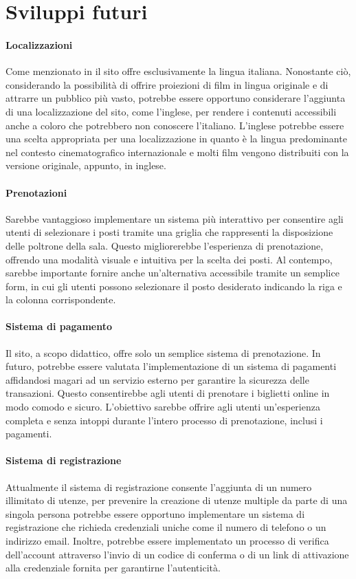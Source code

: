 \section{Sviluppi futuri} \label{sviluppi_futuri}
\paragraph{Localizzazioni} Come menzionato in \textit{} il sito offre esclusivamente la lingua italiana.
Nonostante ciò, considerando la possibilità di offrire proiezioni di film in lingua originale e di attrarre un pubblico più vasto, potrebbe essere opportuno considerare l'aggiunta di una localizzazione del sito, come l'inglese, per rendere i contenuti accessibili anche a coloro che potrebbero non conoscere l'italiano.
L'inglese potrebbe essere una scelta appropriata per una localizzazione in quanto è la lingua predominante nel contesto cinematografico internazionale e molti film vengono distribuiti con la versione originale, appunto, in inglese.

\paragraph{Prenotazioni} Sarebbe vantaggioso implementare un sistema più interattivo per consentire agli utenti di selezionare i posti tramite una griglia che rappresenti la disposizione delle poltrone della sala. Questo migliorerebbe l'esperienza di prenotazione, offrendo una modalità visuale e intuitiva per la scelta dei posti. Al contempo, sarebbe importante fornire anche un'alternativa accessibile tramite un semplice form, in cui gli utenti possono selezionare il posto desiderato indicando la riga e la colonna corrispondente.

\paragraph{Sistema di pagamento} Il sito, a scopo didattico, offre solo un semplice sistema di prenotazione. In futuro, potrebbe essere valutata l'implementazione di un sistema di pagamenti affidandosi magari ad un servizio esterno per garantire la sicurezza delle transazioni. Questo consentirebbe agli utenti di prenotare i biglietti online in modo comodo e sicuro. L'obiettivo sarebbe offrire agli utenti un'esperienza completa e senza intoppi durante l'intero processo di prenotazione, inclusi i pagamenti.

\paragraph{Sistema di registrazione} Attualmente il sistema di registrazione consente l'aggiunta di un numero illimitato di utenze, per prevenire la creazione di utenze multiple da parte di una singola persona potrebbe essere opportuno implementare un sistema di registrazione che richieda credenziali uniche come il numero di telefono o un indirizzo email. Inoltre, potrebbe essere implementato un processo di verifica dell'account attraverso l'invio di un codice di conferma o di un link di attivazione alla credenziale fornita per garantirne l'autenticità.

